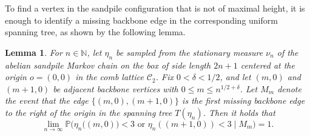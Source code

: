 \documentclass[11pt]{article}
\newtheorem{lemma}{Lemma}[section]
\begin{document}
To find a vertex in the sandpile configuration that is not of maximal height, it is enough to identify a missing backbone edge in the corresponding uniform spanning tree, as shown by the following lemma.

\begin{lemma}\label{lem:height-edge-missing}
For $n\in\mathbb{N}$, let $\eta_n$ be sampled from the stationary measure $\nu_n$ of the abelian sandpile Markov chain on the box of side length $2n+1$ centered at the origin $o=(0,0)$ in the comb lattice $\mathcal{C}_2$. Fix $0<\delta<1/2$, and let $(m,0)$ and $(m+1,0)$ be adjacent backbone vertices with $0\leq m\leq n^{1/2+\delta}$.
Let $M_m$ denote the event that the edge $\{(m,0),(m+1,0)\}$ is the first missing backbone edge to the right of the origin in the spanning tree $T(\eta_n)$. Then it holds that
    $$\lim_{n\to\infty}\mathbb{P}\big(\eta_n\big((m,0)\big)<3\text{ or }\eta_n((m+1,0))<3 \;\vert\; M_m\big)=1.$$
\end{lemma}
\end{document}

